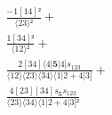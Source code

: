 \documentclass[varwidth, border=5pt]{standalone}
\begin{document}
\begin{my}
$\begin{gathered}
\scriptscriptstyle\frac{-1[14]²}{⟨23⟩²} +\\
\scriptscriptstyle\frac{1[34]²}{⟨12⟩²} +\\
\scriptscriptstyle\frac{2[34]⟨4|𝟓|4]s_{123}}{⟨12⟩⟨23⟩⟨34⟩⟨1|2+4|3]} +\\
\scriptscriptstyle\frac{4[23][34]s_{𝟓}s_{123}}{⟨23⟩⟨34⟩⟨1|2+4|3]²} \phantom{+}
\end{gathered}$
\end{my}
\end{document}
